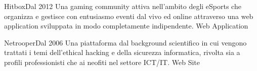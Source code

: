 
\begin{projects}
    \project
    {Hitbox}{Dal 2012}
    {}
    {Una gaming community attiva nell'ambito degli eSports che organizza e gestisce con entusiasmo eventi dal vivo ed online attraverso una web application sviluppata in modo completamente indipendente.}
    {Web Application}

    \project
    {Netrooper}{Dal 2006}
    {}
    {Una piattaforma dal background scientifico in cui vengono trattati i temi dell'ethical hacking e della sicurezza informatica, rivolta sia a profili professionisti che ai neofiti nel settore ICT/IT.}
    {Web Site}
\end{projects}

